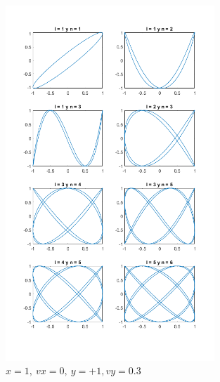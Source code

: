 \documentclass{article}
\begin{document}
\begin{figure}[H]
\centering
    \includegraphics[width=0.7\textwidth]{images/02c.png}
    \caption{$x = 1,~vx = 0,~y = +1, vy = 0.3$}
\end{figure}
\end{document}
